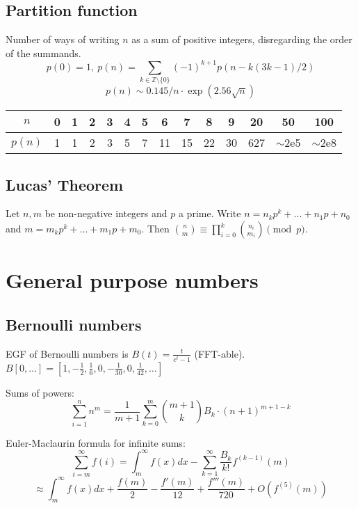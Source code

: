 \subsection{Partition function}
Number of ways of writing $n$ as a sum of positive integers, disregarding the
order of the summands.
\[ p(0) = 1,\ p(n) = \sum_{k \in \mathbb Z \setminus \{0\}}{(-1)^{k+1} p(n - k(3k-1) / 2)} \]
\[ p(n) \sim 0.145 / n \cdot \exp(2.56 \sqrt{n}) \]

\begin{center}
   \begin{tabular}{c|c@{\ }c@{\ }c@{\ }c@{\ }c@{\ }c@{\ }c@{\ }c@{\ }c@{\ }c@{\ }c@{\ }c@{\ }c}
      $n$    & 0 & 1 & 2 & 3 & 4 & 5 & 6  & 7  & 8  & 9  & 20  & 50                 & 100                \\ \hline
      $p(n)$ & 1 & 1 & 2 & 3 & 5 & 7 & 11 & 15 & 22 & 30 & 627 & $\mathtt{\sim}$2e5 & $\mathtt{\sim}$2e8 \\
   \end{tabular}
\end{center}

\subsection{Lucas' Theorem}
Let $n,m$ be non-negative integers and $p$ a prime. Write
$n=n_kp^k+...+n_1p+n_0$ and $m=m_kp^k+...+m_1p+m_0$. Then $\binom{n}{m} \equiv
   \prod_{i=0}^k\binom{n_i}{m_i} \pmod{p}$.

\section{General purpose numbers}
\subsection{Bernoulli numbers}
EGF of Bernoulli numbers is $B(t)=\frac{t}{e^t-1}$ (FFT-able). $B[0,\ldots] =
   [1, -\frac{1}{2}, \frac{1}{6}, 0, -\frac{1}{30}, 0, \frac{1}{42}, \ldots]$

Sums of powers: \small
\[ \sum_{i=1}^n n^m = \frac{1}{m+1} \sum_{k=0}^m \binom{m+1}{k} B_k \cdot (n+1)^{m+1-k} \]
\normalsize

Euler-Maclaurin formula for infinite sums: \small
\[ \sum_{i=m}^{\infty} f(i) = \int_m^\infty f(x) dx - \sum_{k=1}^\infty \frac{B_k}{k!}f^{(k-1)}(m) \]
\[ \approx \int_{m}^\infty f(x)dx + \frac{f(m)}{2} - \frac{f'(m)}{12} + \frac{f'''(m)}{720} + O(f^{(5)}(m)) \]
\normalsize

